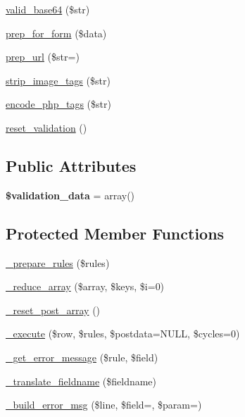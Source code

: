 \begin{DoxyCompactItemize}
\mbox{\hyperlink{class_c_i___form__validation_aea165d42a23db72aa6fe386715450356}{valid\+\_\+base64}} (\$str)
\item 
\mbox{\hyperlink{class_c_i___form__validation_a4dd9fb50878d6fd7f9b00202a5eff2f4}{prep\+\_\+for\+\_\+form}} (\$data)
\item 
\mbox{\hyperlink{class_c_i___form__validation_aa66e364fa7d87870a9fda5dbdfbbb2a5}{prep\+\_\+url}} (\$str=\textquotesingle{}\textquotesingle{})
\item 
\mbox{\hyperlink{class_c_i___form__validation_abc608a4227bcdbc848a4c4d80c0d25cb}{strip\+\_\+image\+\_\+tags}} (\$str)
\item 
\mbox{\hyperlink{class_c_i___form__validation_a02e45774b9bcc341aefc5bf1b55f0e38}{encode\+\_\+php\+\_\+tags}} (\$str)
\item 
\mbox{\hyperlink{class_c_i___form__validation_a5527d98847f46f4e64d0f0aec2916480}{reset\+\_\+validation}} ()
\end{DoxyCompactItemize}
\subsection*{Public Attributes}
\begin{DoxyCompactItemize}
\item 
\mbox{\label{class_c_i___form__validation_a83f91c76a944ec6c6a3dfa6419c23c1a}} 
{\bfseries \$validation\+\_\+data} = array()
\end{DoxyCompactItemize}
\subsection*{Protected Member Functions}
\begin{DoxyCompactItemize}
\item 
\mbox{\hyperlink{class_c_i___form__validation_ac71ddfc3a98aeac0e6b7c98d022e289a}{\+\_\+prepare\+\_\+rules}} (\$rules)
\item 
\mbox{\hyperlink{class_c_i___form__validation_ad2bbb1ae7742bfc05c517b5d807f6b58}{\+\_\+reduce\+\_\+array}} (\$array, \$keys, \$i=0)
\item 
\mbox{\hyperlink{class_c_i___form__validation_a15cf9e9cb1862561772373d7ade5f634}{\+\_\+reset\+\_\+post\+\_\+array}} ()
\item 
\mbox{\hyperlink{class_c_i___form__validation_ac078dbe24b491ce96b87d1b2c29458fb}{\+\_\+execute}} (\$row, \$rules, \$postdata=N\+U\+LL, \$cycles=0)
\item 
\mbox{\hyperlink{class_c_i___form__validation_a0152d92b7ab8b556c260a1e3e1dc0934}{\+\_\+get\+\_\+error\+\_\+message}} (\$rule, \$field)
\item 
\mbox{\hyperlink{class_c_i___form__validation_ac79ae8e18dde776103fdf8ad6cfb48b1}{\+\_\+translate\+\_\+fieldname}} (\$fieldname)
\item 
\mbox{\hyperlink{class_c_i___form__validation_a5d9a8cef789bdaf9fa921b284124af28}{\+\_\+build\+\_\+error\+\_\+msg}} (\$line, \$field=\textquotesingle{}\textquotesingle{}, \$param=\textquotesingle{}\textquotesingle{})
\end{DoxyCompactItemize}
